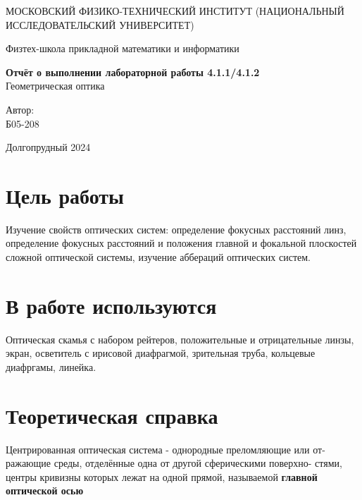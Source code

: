 \documentclass{article}
\begin{document}
\begin{titlepage}
	\begin{center}
		{\large МОСКОВСКИЙ ФИЗИКО-ТЕХНИЧЕСКИЙ ИНСТИТУТ (НАЦИОНАЛЬНЫЙ ИССЛЕДОВАТЕЛЬСКИЙ УНИВЕРСИТЕТ)}
	\end{center}
	\begin{center}
		{\large Физтех-школа прикладной математики и информатики}
	\end{center}
	
	
	\vspace{4.5cm}
	{\huge
		\begin{center}
			{\bf Отчёт о выполнении лабораторной работы 4.1.1/4.1.2}\\
			Геометрическая оптика %
		\end{center}
	}
	\vspace{2cm}
	\begin{flushright}
		{\LARGE Автор: \\
		
			\vspace{0.2cm}
			Б05-208}
	\end{flushright}
	\vspace{3cm}
	\begin{center}
		Долгопрудный 2024
	\end{center}
\end{titlepage}
\thispagestyle{empty}

\newpage

\section{Цель работы}
Изучение свойств оптических систем: определение фокусных расстояний линз, определение фокусных расстояний и положения главной и фокальной плоскостей сложной оптической системы, изучение аббераций оптических систем.


\section{В работе используются} 
Оптическая скамья с набором рейтеров, положительные и отрицательные линзы, экран, осветитель с ирисовой диафрагмой, зрительная труба, кольцевые диафргамы, линейка.


\section{Теоретическая справка} 

Центрированная оптическая система - однородные преломляющие или от-
ражающие среды, отделённые одна от другой сферическими поверхно-
стями, центры кривизны которых лежат на одной прямой, называемой
\textbf{главной оптической осью}
\end{document}
